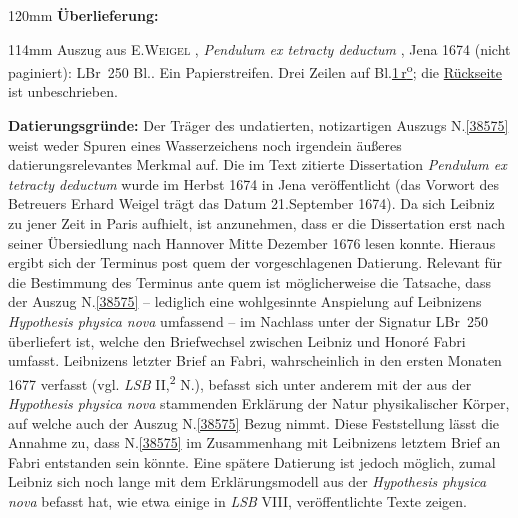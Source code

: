 %
\frenchspacing%
\begin{ledgroupsized}[r]{120mm}%
\footnotesize%
\pstart%
\noindent\textbf{Überlieferung:}%
\pend%
\end{ledgroupsized}%
\begin{ledgroupsized}[r]{114mm}%
\footnotesize%
\pstart%
\parindent -6mm%
%
Auszug aus
\textsc{E.\;Weigel} , \textit{Pendulum ex tetracty deductum}
,
Jena 1674 (nicht paginiert):\cite{02541}
LBr~250 Bl..
Ein Papierstreifen.
Drei Zeilen auf Bl.\;\href{\Scan{LBr_250_001r}}{1\,r\textsuperscript{o}};
die \href{\Scan{LBr_250_001v}}{Rückseite} ist unbeschrieben.
\pend%
\end{ledgroupsized}%
\vspace{5mm}%
\begin{ledgroup}%
\footnotesize%
\pstart%
\noindent%
\textbf{Datierungsgründe:}
Der Träger des undatierten, notizartigen Auszugs N.\;\ref{38575} weist weder Spuren eines Wasserzeichens noch irgendein äußeres datierungsrelevantes Merkmal auf.
Die im Text zitierte Dissertation \textit{Pendulum ex tetracty deductum}\cite{02541} wurde im Herbst 1674 in Jena veröffentlicht (das Vorwort des Betreuers Erhard Weigel trägt das Datum 21.\;September 1674).
Da sich Leibniz zu jener Zeit in Paris aufhielt, ist anzunehmen, dass er die Dissertation erst nach seiner Übersiedlung nach Hannover Mitte Dezember 1676 lesen konnte.
Hieraus ergibt sich der Terminus post quem der vorgeschlagenen Datierung.%
\pend%
\pstart%
Relevant für die Bestimmung des Terminus ante quem ist möglicherweise die Tatsache, dass der Auszug N.\;\ref{38575} -- lediglich eine wohlgesinnte Anspielung auf Leibnizens \textit{Hypothesis physica nova}\cite{00256} umfassend -- im Nachlass unter der Signatur LBr~250 überliefert ist, welche den Briefwechsel zwischen Leibniz und Honoré Fabri umfasst.
Leibnizens letzter Brief an Fabri, wahrscheinlich in den ersten Monaten 1677 verfasst (vgl. \textit{LSB} II,\textsuperscript{2} N.),\cite{01309} befasst sich unter anderem mit der aus der \textit{Hypothesis physica nova}\cite{00256} stammenden Erklärung der Natur physikalischer Körper, auf welche auch der Auszug N.\;\ref{38575} Bezug nimmt.
Diese Feststellung lässt die Annahme zu, dass N.\;\ref{38575} im Zusammenhang mit Leibnizens letztem Brief an Fabri entstanden sein könnte.
Eine spätere Datierung ist jedoch möglich, zumal Leibniz sich noch lange mit dem Erklärungsmodell aus der \textit{Hypothesis physica nova}\cite{00256} befasst hat, wie etwa einige in \textit{LSB} VIII, veröffentlichte Texte zeigen.%
\pend%
\end{ledgroup}%
